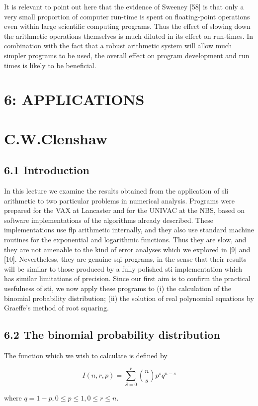 \documentclass[10pt]{article}
\begin{document}
It is relevant to point out here that the evidence of Sweeney [58] is that only a very small proportion of computer run-time is spent on floating-point operations even within large scientific computing programs. Thus the effect of slowing down the arithmetic operations themselves is much diluted in its effect on run-times. In combination with the fact that a robust arithmetic system will allow much simpler programs to be used, the overall effect on program development and run times is likely to be beneficial.

\section*{6: APPLICATIONS}
\section*{C.W.Clenshaw}
\subsection*{6.1 Introduction}
In this lecture we examine the results obtained from the application of sli arithmetic to two particular problems in numerical analysis. Programs were prepared for the VAX at Lancaster and for the UNIVAC at the NBS, based on software implementations of the algorithms already described. These implementations use flp arithmetic internally, and they also use standard machine routines for the exponential and logarithmic functions. Thus they are slow, and they are not amenable to the kind of error analyses which we explored in [9] and [10]. Nevertheless, they are genuine sqi programs, in the sense that their results will be similar to those produced by a fully polished sti implementation which has similar limitations of precision. Since our first aim is to confirm the practical usefulness of sti, we now apply these programs to (i) the calculation of the binomial probability distribution; (ii) the solution of real polynomial equations by Graeffe's method of root squaring.

\subsection*{6.2 The binomial probability distribution}
The function which we wish to calculate is defined by

$$
I(n, r, p)=\sum_{S=0}^{r}\binom{n}{s} p^{s} q^{n-s}
$$

where $q=1-p, 0 \leqslant p \leqslant 1,0 \leqslant r \leqslant n$.
\end{document}

